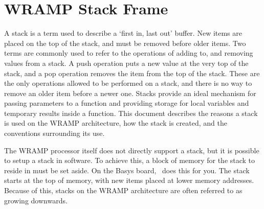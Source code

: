 %
%
\section{WRAMP Stack Frame}

A stack is a term used to describe a `first in, last out' buffer. New
items are placed on the top of the stack, and must be removed before
older items. Two terms are commonly used to refer to the operations of
adding to, and removing values from a stack. A push operation puts a
new value at the very top of the stack, and a pop operation removes the
item from the top of the stack. These are the only operations allowed to
be performed on a stack, and there is no way to remove an older item
before a newer one. Stacks provide an ideal mechanism for passing
parameters to a function and providing storage for local variables and
temporary results inside a function. This document describes the
reasons a stack is used on the WRAMP architecture, how the stack is
created, and the conventions surrounding its use.

The WRAMP processor itself does not directly support a stack, but
it is possible to setup a stack in software. To achieve this, a block
of memory for the stack to reside in must be set aside. On the Basys
board, \WRAMPmon\ does this for you. The stack starts at the top of
memory, with new items placed at lower memory addresses. Because of
this, stacks on the WRAMP architecture are often referred to as
growing downwards.

